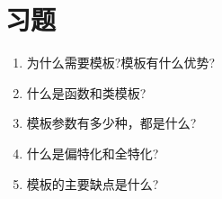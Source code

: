 \section{习题}
\begin{enumerate}
\item
为什么需要模板?模板有什么优势?

\item
什么是函数和类模板?

\item
模板参数有多少种，都是什么?

\item
什么是偏特化和全特化?

\item
模板的主要缺点是什么?
\end{enumerate}